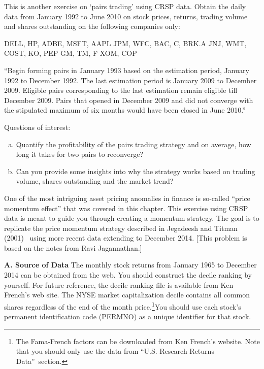 \prob  This is another exercise on `pairs trading' using CRSP data. Obtain the daily data from January 1992 to June 2010 on stock prices, returns, trading volume and shares outstanding on the following companies only:

\indent DELL, HP, ADBE, MSFT, AAPL\hfill \break
\indent JPM, WFC, BAC, C, BRK.A\hfill \break
\indent JNJ, WMT, COST, KO, PEP\hfill \break
\indent GM, TM, F\hfill \break
\indent XOM, COP 

``Begin forming pairs in January 1993 based on the estimation period, January 1992 to December 1992. The last estimation period is January 2009 to December 2009. Eligible pairs corresponding to the last estimation remain eligible till December 2009. Pairs that opened in December 2009 and did not converge with the stipulated maximum of six months would have been closed in June 2010.'' \twomedskip

\noindent Questions of interest:
	\begin{enumerate}[(a)]
	\item Quantify the profitability of the pairs trading strategy and on average, how long it takes for two pairs to reconverge?
	\item Can you provide some insights into why the strategy works based on trading volume, shares outstanding and the market trend? \twomedskip
	\end{enumerate}


\prob One of the most intriguing asset pricing anomalies in finance is so-called  ``price momentum effect'' that was covered in this chapter. This exercise using CRSP data is meant to guide you through creating a momentum strategy. The goal is to replicate the price momentum strategy described in Jegadeesh and Titman (2001)~\cite{JeTi} using more recent data extending to December 2014. [This problem is based on the notes from Ravi Jagannathan.] \twomedskip

\textbf{A. Source of Data}
The monthly stock returns from January 1965 to December 2014 can be obtained from the web. You should construct the decile ranking by yourself. For future reference, the decile ranking file is available from Ken French's web site. The NYSE market capitalization decile contains all common shares regardless of the end of the month price.\footnote{The Fama-French factors can be downloaded from Ken French's website. Note that you should only use the data from \textquotedblleft U.S. Research Returns Data\textquotedblright\ section.}You should use each stock's permanent identification code (PERMNO) as a unique identifier for that stock.

